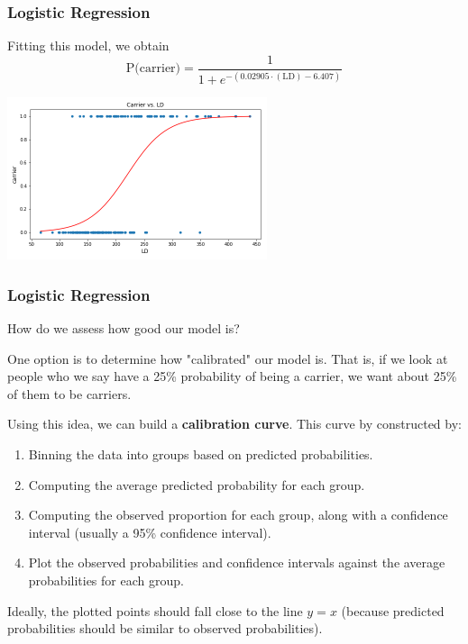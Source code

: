\documentclass[11pt, table]{beamer}
\begin{document}
\begin{frame}
\frametitle{Logistic Regression}
Fitting this model, we obtain
$$\text{P(carrier)} = \frac{1}{1 + e^{-(0.02905\cdot(\text{LD}) - 6.407)}}$$
\begin{center}
	\includegraphics[width = 3in]{images/Dystrophy/scatter_03.png}
\end{center}

\end{frame}

\begin{frame}
\frametitle{Logistic Regression}
How do we assess how good our model is? 

One option is to determine how "calibrated" our model is. That is, if we look at people who we say have a 25\% probability of being a carrier, we want about 25\% of them to be carriers.
\vspace{0.1in}

Using this idea, we can build a \textbf{calibration curve}. This curve by constructed by:
\begin{enumerate}
	\item Binning the data into groups based on predicted probabilities.
	\item Computing the average predicted probability for each group.
	\item Computing the observed proportion for each group, along with a confidence interval (usually a 95\% confidence interval).
	\item Plot the observed probabilities and confidence intervals against the average probabilities for each group.
\end{enumerate}

Ideally, the plotted points should fall close to the line $y = x$ (because predicted probabilities should be similar to observed probabilities).
\end{frame}
\end{document}

